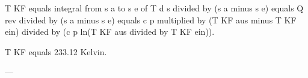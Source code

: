 T KF equals integral from s a to s e of T d s divided by (s a minus s e) equals Q rev divided by (s a minus s e) equals c p multiplied by (T KF aus minus T KF ein) divided by (c p ln(T KF aus divided by T KF ein)).  

T KF equals 233.12 Kelvin.  

---